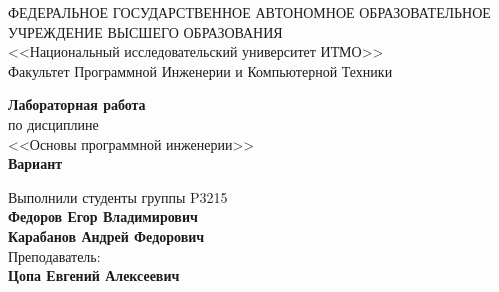 \begin{titlepage}
	\thispagestyle{firststyle}
	\begin{center}
		ФЕДЕРАЛЬНОЕ ГОСУДАРСТВЕННОЕ АВТОНОМНОЕ ОБРАЗОВАТЕЛЬНОЕ УЧРЕЖДЕНИЕ ВЫСШЕГО ОБРАЗОВАНИЯ\\
		\vspace{0.5cm}
		<<Национальный исследовательский университет ИТМО>>\\
		Факультет Программной Инженерии и Компьютерной Техники \\
		\vspace{1cm}
	\end{center}

	\vspace{1cm}

	\begin{center}
		\large
		\textbf{Лабораторная работа }\\
		по дисциплине\\
		<<Основы программной инженерии>> \\
		\textbf{Вариант }
	\end{center}

	\vspace{2cm}

	\begin{flushright}
		Выполнили студенты  группы P3215\\
		\textbf{Федоров Егор Владимирович} \\
		\textbf{Карабанов Андрей Федорович} \\
		Преподаватель: \\
		\textbf{Цопа Евгений Алексеевич}\\
	\end{flushright}

\end{titlepage}
